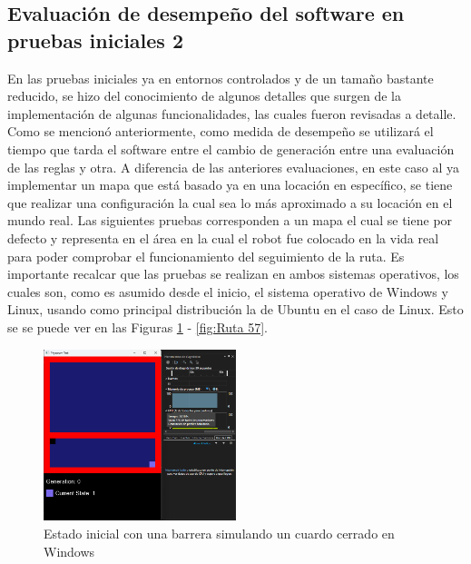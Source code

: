 \subsection{Evaluaci\'on de desempe\~no del software en pruebas iniciales 2}
    En las pruebas iniciales ya en entornos controlados y de un
        tama\~no bastante reducido, se hizo del conocimiento de
        algunos detalles que surgen de la implementaci\'on de algunas
        funcionalidades, las cuales fueron revisadas a detalle.
    \vskip 0.5cm
    Como se mencion\'o anteriormente, como medida de
        desempe\~no se utilizar\'a el tiempo que tarda el software entre
        el cambio de generaci\'on entre una evaluaci\'on de las reglas y
        otra. A diferencia de las anteriores evaluaciones, en este caso
        al ya implementar un mapa que est\'a basado ya en una
        locaci\'on en espec\'ifico, se tiene que realizar una
        configuraci\'on la cual sea lo m\'as aproximado a su locaci\'on
        en el mundo real.
    \vskip 0.5cm
    Las siguientes pruebas corresponden a un mapa el cual se
        tiene por defecto y representa en el \'area en la cual el robot
        fue colocado en la vida real para poder comprobar el
        funcionamiento del seguimiento de la ruta. Es importante
        recalcar que las pruebas se realizan en ambos sistemas
        operativos, los cuales son, como es asumido desde el inicio, 
        el sistema operativo de Windows y Linux, usando como
        principal distribuci\'on la de Ubuntu en el caso de Linux. Esto se
        se puede ver en las Figuras \ref{fig:Ruta 47} - \ref{fig:Ruta 57}.
    \vskip 0.5cm
    \begin{figure}[htbp]
        \centering
        \includegraphics[width=0.5\textwidth]{./images/Pruebas/simulador/image047.png}
        \caption{Estado inicial con una barrera simulando un cuardo cerrado en Windows}
        \label{fig:Ruta 47}
    \end{figure}
    \vskip 0.5cm
